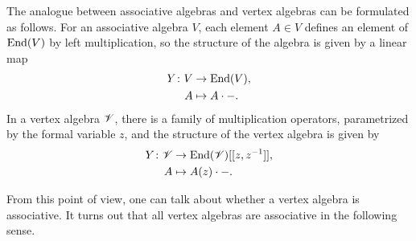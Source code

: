 The analogue between associative algebras and vertex algebras
can be formulated as follows.
For an associative algebra $V$, each element $A \in V$
defines an element of $\operatorname{End} (V)$ by left multiplication,
so the structure of the algebra is given by a linear map
\begin{align*}
    Y \colon V & \to \operatorname{End} (V), \\
    A & \mapsto A \cdot {-}.
\end{align*}
In a vertex algebra $\mathscr{V}$, there is a family of multiplication operators,
parametrized by the formal variable $z$,
and the structure of the vertex algebra is given by
\begin{align*}
    Y \colon \mathscr{V} & \to \operatorname{End}(\mathscr{V}) [[z, z^{-1}]], \\
    A & \mapsto A (z) \cdot -.
\end{align*}

From this point of view,
one can talk about whether a vertex algebra
is associative.
It turns out that all vertex algebras
are associative in the following sense.

